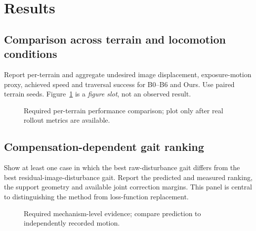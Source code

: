 \section{Results}\label{sec:results}
\noindent{}
\subsection{Comparison across terrain and locomotion conditions}
Report per-terrain and aggregate undesired image displacement, exposure-motion proxy, achieved speed and traversal success for B0--B6 and Ours. Use paired terrain seeds. Figure~\ref{fig:resultmap} is a \emph{figure slot}, not an observed result.
\begin{figure}[ht]\centering
{}
\caption{Required per-terrain performance comparison; plot only after real rollout metrics are available.}\label{fig:resultmap}
\end{figure}
\subsection{Compensation-dependent gait ranking}
Show at least one case in which the best raw-disturbance gait differs from the best residual-image-disturbance gait. Report the predicted and measured ranking, the support geometry and available joint correction margins. This panel is central to distinguishing the method from loss-function replacement.
\begin{figure}[ht]\centering
{}
\caption{Required mechanism-level evidence; compare prediction to independently recorded motion.}\label{fig:ranking}
\end{figure}
